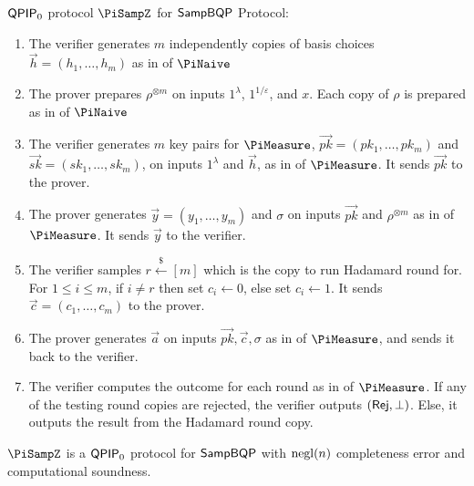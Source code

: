\begin{protocol}{$\operatorname{\mathsf{QPIP}}_0$ protocol $\PiSampZ$ for $\operatorname{\mathsf{SampBQP}}$}
Protocol:
\begin{enumerate}
	\item The verifier generates $m$ independently copies of basis choices $\vec{h}=(h_1,\ldots,h_m)$ as in  of $\PiNaive$
	\item The prover prepares $\rho^{\otimes m}$ on inputs $1^\lambda$, $1^{1/\varepsilon}$, and $x$. Each copy of $\rho$ is prepared as in  of $\PiNaive$
	\item The verifier generates $m$ key pairs for $\PiMeasure$, $\vec{pk}=(pk_1,\ldots,pk_m)$ and $\vec{sk}=(sk_1,\ldots,sk_m)$, on inputs $1^\lambda$ and $\vec{h}$, as in  of $\PiMeasure$.
		It sends $\vec{pk}$ to the prover.
	\item The prover generates $\vec{y}=(y_1,\ldots,y_m)$ and $\sigma$ on inputs $\vec{pk}$ and $\rho^{\otimes m}$ as in  of $\PiMeasure$.
		It sends $\vec{y}$ to the verifier.
	\item The verifier samples $r\xleftarrow{\$}[m]$ which is the copy to run Hadamard round for.
		For $1\leq i\leq m$, if $i\ne r$ then set $c_i\leftarrow 0$, else set $c_i\leftarrow 1$.
		It sends $\vec{c}=(c_1,\ldots,c_m)$ to the prover.
	\item The prover generates $\vec{a}$ on inputs $\vec{pk}, \vec{c}, \sigma$ as in  of $\PiMeasure$, and sends it back to the verifier.
	\item \label{step:multi-testing}
		The verifier computes the outcome for each round as in  of $\PiMeasure$.
		If any of the testing round copies are rejected, the verifier outputs $(\mathsf{Rej}, \bot)$.
		Else, it outputs the result from the Hadamard round copy.
\end{enumerate}
\end{protocol}


\begin{theorem}\label{thm:qpip0}
	$\PiSampZ$ is a $\operatorname{\mathsf{QPIP}}_0$ protocol for $\operatorname{\mathsf{SampBQP}}$ with $\operatorname{negl}(n)$ completeness error and computational soundness. 
\end{theorem}



